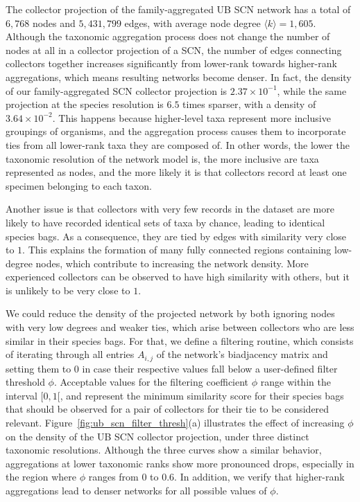 The collector projection of the family-aggregated UB SCN network has a total of $6,768$ nodes and $5,431,799$ edges, with average node degree $\langle k \rangle = 1,605$.
Although the taxonomic aggregation process does not change the number of nodes at all in a collector projection of a SCN, the number of edges connecting collectors together increases significantly from lower-rank towards higher-rank aggregations, which means resulting networks become denser.
In fact, the density of our family-aggregated SCN collector projection is $2.37 \times 10^{-1}$, while the same projection at the species resolution is $6.5$ times sparser, with a density of $3.64 \times 10^{-2}$. 
This happens because higher-level taxa represent more inclusive groupings of organisms, and the aggregation process causes them to incorporate ties from all lower-rank taxa they are composed of.
In other words, the lower the taxonomic resolution of the network model is, the more inclusive are taxa represented as nodes, and the more likely it is that collectors record at least one specimen belonging to each taxon. 

Another issue is that collectors with very few records in the dataset are more likely to have recorded identical sets of taxa by chance, leading to identical species bags.
As a consequence, they are tied by edges with similarity very close to $1$.
This explains the formation of many fully connected regions containing low-degree nodes, which contribute to increasing the network density.
More experienced collectors can be observed to have high similarity with others, but it is unlikely to be very close to $1$.

We could reduce the density of the projected network by both ignoring nodes with very low degrees and weaker ties, which arise between collectors who are less similar in their species bags.
For that, we define a filtering routine, which consists of iterating through all entries $A_{i,j}$ of the network's biadjacency matrix and setting them to $0$ in case their respective values fall below a user-defined filter threshold $\phi$.
Acceptable values for the filtering coefficient $\phi$ range within the interval $[0,1[$, and represent the minimum similarity score for their species bags that should be observed for a pair of collectors for their tie to be considered relevant.
Figure~\ref{fig:ub_scn_filter_thresh}(a) illustrates the effect of increasing $\phi$ on the density of the UB SCN collector projection, under three distinct taxonomic resolutions.
Although the three curves show a similar behavior, aggregations at lower taxonomic ranks show more pronounced drops, especially in the region where $\phi$ ranges from $0$ to $0.6$.
In addition, we verify that higher-rank aggregations lead to denser networks for all possible values of $\phi$.

